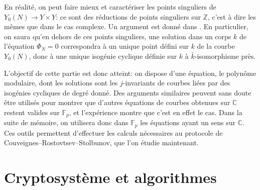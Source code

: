 \documentclass[11pt,a4paper]{article}
\newcommand{\Z}{\mathbb{Z}}
\newcommand{\C}{\mathbb{C}}
\newcommand{\F}{\mathbb{F}}
\newcommand{\vers}{\longrightarrow}
\renewcommand{\v}{\vspace{5mm}}
\theoremstyle{definition}
\begin{document}
En réalité, on peut faire mieux et caractériser les points singuliers de $Y_0(N)\vers Y\times Y$: ce sont des réductions de points singuliers sur $\Z$, c'est à dire les mêmes que dans le cas complexe. Un argument est donné dans \cite{}. En particulier, on saura qu'en dehors de ces points singuliers, une solution dans un corps $k$ de l'équation $\Phi_N = 0$ correspondra à un unique point défini sur $k$ de la courbe $Y_0(N)$, donc à une unique isogénie cyclique définie sur $k$ à $\bar{k}$-isomorphisme près.
\v

L'objectif de cette partie est donc atteint: on dispose d'une équation, le polynôme modulaire, dont les solutions sont les $j$-invariants de courbes liées par des isogénies cycliques de degré donné. Des arguments similaires peuvent sans doute être utilisés pour montrer que d'autres équations de courbes obtenues sur $\C$ restent valides sur $\F_p$, et l'expérience montre que c'est en effet le cas. Dans la suite de mémoire, on utilisera donc dans $\F_p$ les équations ayant un sens sur $\C$. Ces outils permettent d'effectuer les calculs nécessaires au protocole de Couveignes--Rostovtsev--Stolbunov, que l'on étudie maintenant.

\newpage

\section{Cryptosystème et algorithmes}
\end{document}
